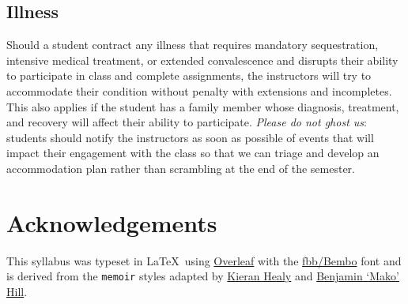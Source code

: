 \documentclass[10pt]{memoir}
\def\datedate{\datedayname,\space\datemonthname~\thedateday}
\newcommand{\adddays}[1]{%
    \addtocounter{datenumber}{#1}%
    \setdatebynumber{\thedatenumber}%
}
\begin{document}
\subsection{Illness}
Should a student contract any illness that requires mandatory sequestration, intensive medical treatment, or extended convalescence and disrupts their ability to participate in class and complete assignments, the instructors will try to accommodate their condition without penalty with extensions and incompletes. This also applies if the student has a family member whose diagnosis, treatment, and recovery will affect their ability to participate. \textit{Please do not ghost us}: students should notify the instructors as soon as possible of events that will impact their engagement with the class so that we can triage and develop an accommodation plan rather than scrambling at the end of the semester.

\section{Acknowledgements}

This syllabus was typeset in \LaTeX~using \href{http://www.sharelatex.com}{Overleaf} with the \href{http://www.tug.dk/FontCatalogue/fbb/}{fbb/Bembo} font and is derived from the \texttt{memoir} styles adapted by \href{https://github.com/kjhealy/latex-custom-kjh}{Kieran Healy} and \href{http://projects.mako.cc/source/?p=latex_mako;a=summary}{Benjamin `Mako' Hill}.

\clearpage



\end{document}
